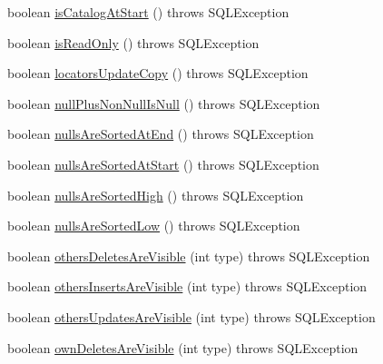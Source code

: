 \begin{DoxyCompactItemize}
\item 
boolean \mbox{\hyperlink{classcom_1_1mysql_1_1jdbc_1_1_database_meta_data_a908de8843d8b2295146499fdab0c85fe}{is\+Catalog\+At\+Start}} ()  throws S\+Q\+L\+Exception 
\item 
boolean \mbox{\hyperlink{classcom_1_1mysql_1_1jdbc_1_1_database_meta_data_a11f9977fccf76a455f725cef513e3b8d}{is\+Read\+Only}} ()  throws S\+Q\+L\+Exception 
\item 
boolean \mbox{\hyperlink{classcom_1_1mysql_1_1jdbc_1_1_database_meta_data_a5c029c7d3dd2664252ebeaf73f501631}{locators\+Update\+Copy}} ()  throws S\+Q\+L\+Exception 
\item 
boolean \mbox{\hyperlink{classcom_1_1mysql_1_1jdbc_1_1_database_meta_data_af460ce240d8528baddb59ac0d001d574}{null\+Plus\+Non\+Null\+Is\+Null}} ()  throws S\+Q\+L\+Exception 
\item 
boolean \mbox{\hyperlink{classcom_1_1mysql_1_1jdbc_1_1_database_meta_data_ab7357b64ef00c6262f5aa7ba2f6ce361}{nulls\+Are\+Sorted\+At\+End}} ()  throws S\+Q\+L\+Exception 
\item 
boolean \mbox{\hyperlink{classcom_1_1mysql_1_1jdbc_1_1_database_meta_data_ac403aa347ab2be7ba999b33b7d307151}{nulls\+Are\+Sorted\+At\+Start}} ()  throws S\+Q\+L\+Exception 
\item 
boolean \mbox{\hyperlink{classcom_1_1mysql_1_1jdbc_1_1_database_meta_data_ada8162ea7997c43c5cf2907eceac2142}{nulls\+Are\+Sorted\+High}} ()  throws S\+Q\+L\+Exception 
\item 
boolean \mbox{\hyperlink{classcom_1_1mysql_1_1jdbc_1_1_database_meta_data_a706668b3a16fb53d6a1d862ecfb8be09}{nulls\+Are\+Sorted\+Low}} ()  throws S\+Q\+L\+Exception 
\item 
boolean \mbox{\hyperlink{classcom_1_1mysql_1_1jdbc_1_1_database_meta_data_ae7cfc8a4174334538c3c6a847785fc83}{others\+Deletes\+Are\+Visible}} (int type)  throws S\+Q\+L\+Exception 
\item 
boolean \mbox{\hyperlink{classcom_1_1mysql_1_1jdbc_1_1_database_meta_data_a7853ca21c0e5aafcd8b348c0804d761f}{others\+Inserts\+Are\+Visible}} (int type)  throws S\+Q\+L\+Exception 
\item 
boolean \mbox{\hyperlink{classcom_1_1mysql_1_1jdbc_1_1_database_meta_data_adcae7a4fa6824a850662ac5d2d6db5e2}{others\+Updates\+Are\+Visible}} (int type)  throws S\+Q\+L\+Exception 
\item 
boolean \mbox{\hyperlink{classcom_1_1mysql_1_1jdbc_1_1_database_meta_data_a697dc294c2661cd48c5b285714fb8fd3}{own\+Deletes\+Are\+Visible}} (int type)  throws S\+Q\+L\+Exception 

\end{DoxyCompactItemize}
